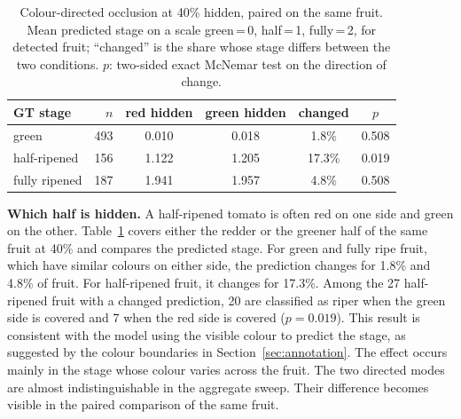 \begin{table}[t]
\centering
\caption{Colour-directed occlusion at 40\% hidden, paired on the same fruit.
Mean predicted stage on a scale green\,=\,0, half\,=\,1, fully\,=\,2, for
detected fruit; ``changed'' is the share whose stage differs between the two
conditions. $p$: two-sided exact McNemar test on the direction of change.}
\label{tab:colour-flip}
\begin{tabular}{lrcccc}
\toprule
GT stage & $n$ & red hidden & green hidden & changed & $p$ \\
\midrule
green         & 493 & 0.010 & 0.018 & 1.8\%  & 0.508 \\
half-ripened  & 156 & 1.122 & 1.205 & 17.3\% & 0.019 \\
fully ripened & 187 & 1.941 & 1.957 & 4.8\%  & 0.508 \\
\bottomrule
\end{tabular}
\end{table}

\textbf{Which half is hidden.} A half-ripened tomato is often red on one side
and green on the other. Table~\ref{tab:colour-flip} covers either the redder or
the greener half of the same fruit at 40\% and compares the predicted stage.
For green and fully ripe fruit, which have similar colours on either side, the
prediction changes for 1.8\% and 4.8\% of fruit. For half-ripened fruit, it
changes for 17.3\%. Among the 27 half-ripened fruit with a changed prediction,
20 are classified as riper when the green side is covered and 7 when the red
side is covered ($p=0.019$). This result is consistent with the model using the
visible colour to predict the stage, as suggested by the colour boundaries in
Section~\ref{sec:annotation}. The effect occurs mainly in the stage whose colour
varies across the fruit. The two directed modes are almost indistinguishable in
the aggregate sweep. Their difference becomes visible in the paired comparison
of the same fruit.

